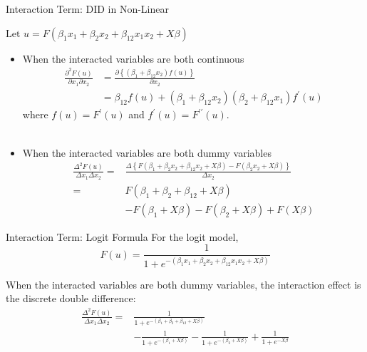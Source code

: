 \begin{frame}{Interaction Term: DID in Non-Linear}

$\text{Let } u=F\left(\beta_1 x_1+\beta_2 x_2+\beta_{12} x_1 x_2+X \beta\right)$
\begin{itemize}
\item When the interacted variables are both continuous
$$
\begin{aligned}
\frac{\partial^2 F(u)}{\partial x_1 \partial x_2} & =\frac{\partial\left\{\left(\beta_1+\beta_{12} x_2\right) f(u)\right\}}{\partial x_2} \\
& =\beta_{12} f(u)+\left(\beta_1+\beta_{12} x_2\right)\left(\beta_2+\beta_{12} x_1\right) f^{\prime}(u)
\end{aligned}
$$
where $f(u)=F^{\prime}(u)$ and $f^{\prime}(u)=F^{\prime \prime}(u)$.
\\ \hspace*{\fill} \\
\item When the interacted variables are both dummy variables
$$
\begin{aligned}
\frac{\Delta^2 F(u)}{\Delta x_1 \Delta x_2}= & \frac{\Delta\left\{F\left(\beta_1+\beta_2 x_2+\beta_{12} x_2+X \beta\right)-F\left(\beta_2 x_2+X \beta\right)\right\}}{\Delta x_2} \\
= & F\left(\beta_1+\beta_2+\beta_{12}+X \beta\right) \\
& -F\left(\beta_1+X \beta\right)-F\left(\beta_2+X \beta\right)+F(X \beta)
\end{aligned}
$$

\end{itemize}
\end{frame}


\begin{frame}{Interaction Term: Logit Formula}
For the logit model,
$$
F(u)=\frac{1}{1+e^{-\left(\beta_1 x_1+\beta_2 x_2+\beta_{12} x_1 x_2+X \beta\right)}}
$$

When the interacted variables are both dummy variables, the interaction effect is the discrete double difference:
$$
\begin{aligned}
\frac{\Delta^2 F(u)}{\Delta x_1 \Delta x_2}= & \frac{1}{1+e^{-\left(\beta_1+\beta_2+\beta_{12}+X \beta\right)}} \\
& -\frac{1}{1+e^{-\left(\beta_1+X \beta\right)}}-\frac{1}{1+e^{-\left(\beta_2+X \beta\right)}}+\frac{1}{1+e^{-X \beta}}
\end{aligned}
$$
\end{frame}



